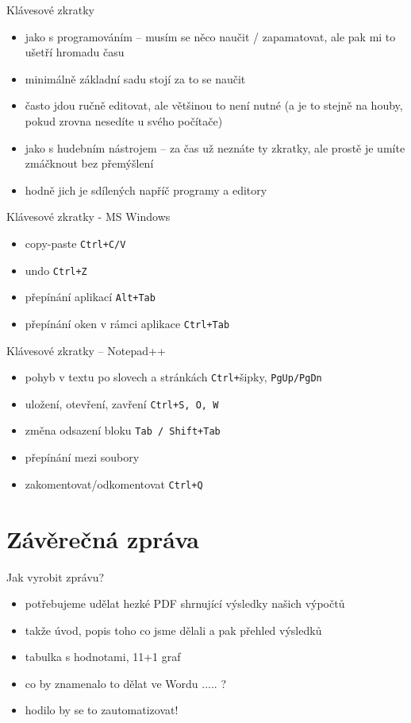 \documentclass{beamer}
\begin{document}
\begin{frame}{Klávesové zkratky}
  \begin{itemize}
    \item jako s programováním -- musím se něco naučit / zapamatovat, ale pak mi to ušetří hromadu času
    \item minimálně základní sadu stojí za to se naučit
    \item často jdou ručně editovat, ale většinou to není nutné (a je to stejně na houby, pokud zrovna nesedíte u svého počítače)
    \item jako s hudebním nástrojem -- za čas už neznáte ty zkratky, ale prostě je umíte zmáčknout bez přemýšlení
    \item hodně jich je sdílených napříč programy a editory
  \end{itemize}
\end{frame}

\begin{frame}{Klávesové zkratky - MS Windows}
  \begin{itemize}
    \item copy-paste \texttt{Ctrl+C/V}
    \item undo \texttt{Ctrl+Z}
    \item přepínání aplikací \texttt{Alt+Tab}
    \item přepínání oken v rámci aplikace \texttt{Ctrl+Tab}
  \end{itemize}
\end{frame}

\begin{frame}{Klávesové zkratky -- Notepad++}
  \begin{itemize}
    \item pohyb v textu po slovech a stránkách  \texttt{Ctrl+}šipky, \texttt{PgUp/PgDn}
    \item uložení, otevření, zavření  \texttt{Ctrl+S, O, W}
    \item změna odsazení bloku \texttt{Tab / Shift+Tab}
    \item přepínání mezi soubory
    \item zakomentovat/odkomentovat \texttt{Ctrl+Q}
  \end{itemize}
\end{frame}

\section{Závěrečná zpráva}

\begin{frame}{Jak vyrobit zprávu?}
  \begin{itemize}
    \item potřebujeme udělat hezké PDF shrnující výsledky našich výpočtů
    \item takže úvod, popis toho co jsme dělali a pak přehled výsledků
    \item tabulka s hodnotami, 11+1 graf
    \item co by znamenalo to dělat ve Wordu ..... ?
    \item hodilo by se to zautomatizovat!
  \end{itemize}
\end{frame}
\end{document}
